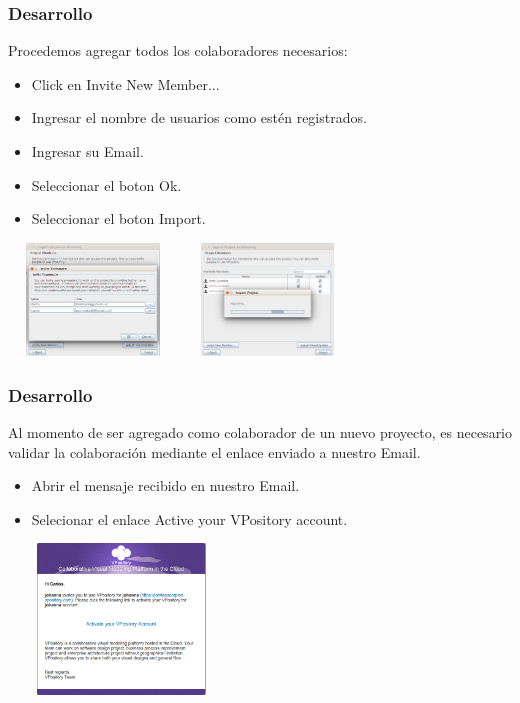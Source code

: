 \documentclass[8pt]{beamer}
\begin{document}
\begin{frame}
\frametitle{Desarrollo}
Procedemos agregar todos los colaboradores necesarios:

\setlength{\parskip}{03pt}
\begin{center}
\begin{itemize}
\item{Click en Invite New Member...}
\item{Ingresar el nombre de usuarios como estén registrados.}
\item{Ingresar su Email.}
\item{Seleccionar el boton Ok.}
\item{Seleccionar el boton Import.}
\end{itemize} 

\setlength{\parskip}{08pt}
\includegraphics[width=4.5cm, height=3cm]{img/cap12} \hspace{0.5cm}
\includegraphics[width=4.5cm, height=3cm]{img/cap13}
\end{center}
\end{frame}


\begin{frame}
\frametitle{Desarrollo}
Al momento de ser agregado como colaborador de un nuevo proyecto, es necesario validar la colaboración mediante el enlace enviado a nuestro Email.

\setlength{\parskip}{03pt}
\begin{center}
\begin{itemize}
\item{Abrir el mensaje recibido en nuestro Email.}
\item{Selecionar el enlace Active your VPository account.}
\end{itemize} 

\setlength{\parskip}{08pt}
\includegraphics[width=06cm, height=4cm]{img/cap16}
\end{center}
\end{frame}
\end{document}
